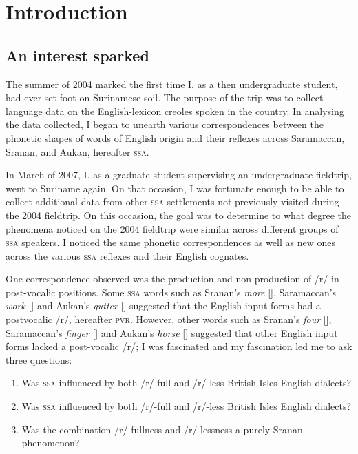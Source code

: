 \chapter{Introduction}\label{ch:1}

\section{An interest sparked} \label{1.1}
The summer of 2004 marked the first time I, as a then undergraduate student, had ever set foot on Surinamese soil. The purpose of the trip was to collect language data on the English-lexicon creoles spoken in the country. In analysing the data collected, I began to unearth various correspondences between the phonetic shapes of words of English origin and their reflexes across Saramaccan, Sranan, and Aukan, hereafter \textsc{ssa}.

In March of 2007, I, as a graduate student supervising an undergraduate fieldtrip, went to Suriname again. On that occasion, I was fortunate enough to be able to collect additional data from other \textsc{ssa}  settlements not previously visited during the 2004 fieldtrip. On this occasion, the goal was to determine to what degree the phenomena noticed on the 2004 fieldtrip were similar across different groups of \textsc{ssa}  speakers. I noticed the same phonetic correspondences as well as new ones across the various \textsc{ssa}  reflexes and their English cognates.

One correspondence observed was the production and non-production of /r/ in post-vocalic positions. Some \textsc{ssa}  words such as Sranan's \emph{more} [], Saramaccan's \emph{work} [] and Aukan's  \emph{gutter} [] suggested that the English input forms had a postvocalic /r/, hereafter \textsc{pvr}. However, other words such as Sranan's \emph{four} [], Saramaccan's \emph{finger} [] and Aukan's \emph{horse} [] suggested that other English input forms lacked a post-vocalic /r/; I was fascinated and my fascination led me to ask three questions:

\begin{enumerate}
\item Was \textsc{ssa}  influenced by both /r/-full and /r/-less British Isles English dialects?
\item Was \textsc{ssa}  influenced by both /r/-full and /r/-less British Isles English dialects?
\item Was the combination /r/-fullness and /r/-lessness a purely Sranan phenomenon?
\end{enumerate}

